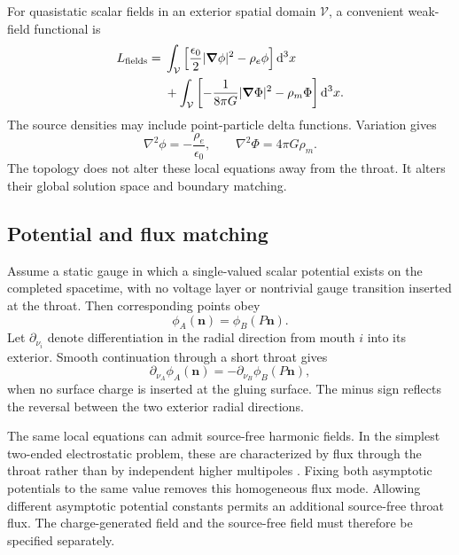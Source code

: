 \documentclass[journal,a4paper]{IEEEtran}
\begin{document}
For quasistatic scalar fields in an exterior spatial domain \(\mathcal V\), a convenient weak-field functional is
\begin{equation}
\begin{split}
L_{\rm fields}={}&
\int_{\mathcal V}
\left[
\frac{\epsilon_0}{2}|\boldsymbol\nabla\phi|^2
-\rho_e\phi
\right]\mathrm{d}^3x\\
&+\int_{\mathcal V}
\left[
-\frac{1}{8\pi G}|\boldsymbol\nabla\Phi|^2
-\rho_m\Phi
\right]\mathrm{d}^3x.
\label{eq:weak_field_functional}
\end{split}
\end{equation}
The source densities may include point-particle delta functions. Variation gives
\begin{equation}
    \nabla^2\phi=-\frac{\rho_e}{\epsilon_0},
    \qquad
    \nabla^2\Phi=4\pi G\rho_m.
    \label{eq:poisson_equations}
\end{equation}
The topology does not alter these local equations away from the throat. It alters their global solution space and boundary matching.

\subsection{Potential and flux matching}

Assume a static gauge in which a single-valued scalar potential exists on the completed spacetime, with no voltage layer or nontrivial gauge transition inserted at the throat. Then corresponding points obey
\begin{equation}
    \phi_A(\mathbf n)=\phi_B(P\mathbf n).
    \label{eq:potential_matching}
\end{equation}
Let \(\partial_{\nu_i}\) denote differentiation in the radial direction from mouth \(i\) into its exterior. Smooth continuation through a short throat gives
\begin{equation}
    \partial_{\nu_A}\phi_A(\mathbf n)
    =-\partial_{\nu_B}\phi_B(P\mathbf n),
    \label{eq:normal_matching}
\end{equation}
when no surface charge is inserted at the gluing surface. The minus sign reflects the reversal between the two exterior radial directions.

The same local equations can admit source-free harmonic fields. In the simplest two-ended electrostatic problem, these are characterized by flux through the throat rather than by independent higher multipoles \cite{Krasnikov2008}. Fixing both asymptotic potentials to the same value removes this homogeneous flux mode. Allowing different asymptotic potential constants permits an additional source-free throat flux. The charge-generated field and the source-free field must therefore be specified separately.
\end{document}
